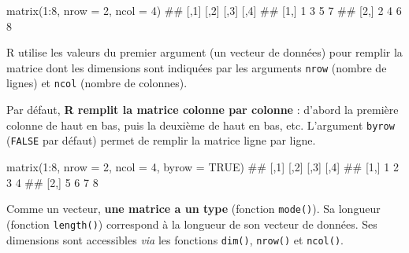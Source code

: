 \documentclass[12pt,twosided, notitlepage]{book}
\newenvironment{Shaded}{}{}
\newcommand{\DataTypeTok}[1]{#1}
\newcommand{\DecValTok}[1]{#1}
\newcommand{\KeywordTok}[1]{\textcolor[rgb]{0.00,0.00,1.00}{#1}}
\newcommand{\NormalTok}[1]{#1}
\newcommand{\OperatorTok}[1]{#1}
\newcommand{\OtherTok}[1]{\textcolor[rgb]{1.00,0.25,0.00}{#1}}
\renewenvironment{Shaded}{\begin{snugshade}}{\end{snugshade}}
\begin{document}
\begin{Shaded}
\begin{Highlighting}[]
\KeywordTok{matrix}\NormalTok{(}\DecValTok{1}\OperatorTok{:}\DecValTok{8}\NormalTok{, }\DataTypeTok{nrow =} \DecValTok{2}\NormalTok{, }\DataTypeTok{ncol =} \DecValTok{4}\NormalTok{)}
\NormalTok{  ##      [,1] [,2] [,3] [,4]}
\NormalTok{  ## [1,]    1    3    5    7}
\NormalTok{  ## [2,]    2    4    6    8}
\end{Highlighting}
\end{Shaded}

R utilise les valeurs du premier argument (un vecteur de données) pour
remplir la matrice dont les dimensions sont indiquées par les arguments
\texttt{nrow} (nombre de lignes) et \texttt{ncol} (nombre de colonnes).

Par défaut, \textbf{R remplit la matrice colonne par colonne} : d'abord
la première colonne de haut en bas, puis la deuxième de haut en bas,
etc. L'argument \texttt{byrow} (\texttt{FALSE} par défaut) permet de
remplir la matrice ligne par ligne.

\begin{Shaded}
\begin{Highlighting}[]
\KeywordTok{matrix}\NormalTok{(}\DecValTok{1}\OperatorTok{:}\DecValTok{8}\NormalTok{, }\DataTypeTok{nrow =} \DecValTok{2}\NormalTok{, }\DataTypeTok{ncol =} \DecValTok{4}\NormalTok{, }\DataTypeTok{byrow =} \OtherTok{TRUE}\NormalTok{)}
\NormalTok{  ##      [,1] [,2] [,3] [,4]}
\NormalTok{  ## [1,]    1    2    3    4}
\NormalTok{  ## [2,]    5    6    7    8}
\end{Highlighting}
\end{Shaded}

Comme un vecteur, \textbf{une matrice a un type} (fonction
\texttt{mode()}). Sa longueur (fonction
\texttt{length()}) correspond à la longueur de
son vecteur de données. Ses dimensions sont accessibles \emph{via} les
fonctions \texttt{dim()},
\texttt{nrow()} et
\texttt{ncol()}.
\end{document}
